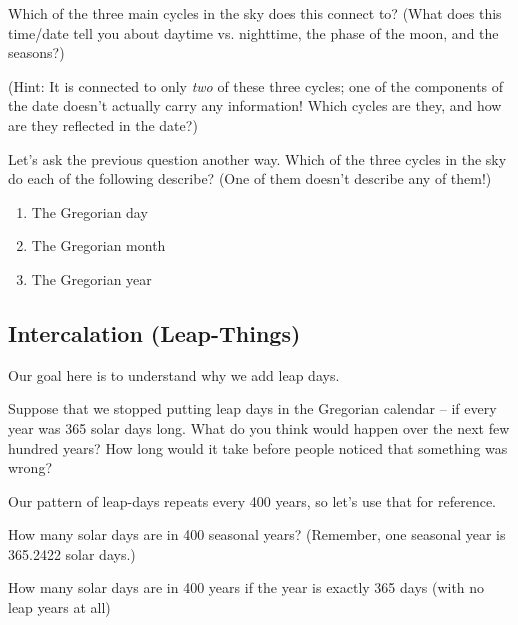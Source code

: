 \documentclass[11pt]{article}
\begin{document}
Which of the three main cycles in the sky does this connect to? (What does this time/date tell you about daytime vs. nighttime, the phase of the moon, and the seasons?) 

(Hint: It is connected to only {\it two} of these three cycles; one of the components of the date doesn't actually carry any information! Which cycles are they, and how are they reflected in the date?)

\vspace{2in} \underline{\hspace{6in}}

Let's ask the previous question another way. Which of the three cycles in the sky do each of the following describe? (One of them doesn't describe any of them!)

\begin{enumerate}
	\item The Gregorian day
	\vspace{0.5in}
	\item The Gregorian month
		\vspace{0.5in}
	\item The Gregorian year
\end{enumerate}

\newpage

\subsection{Intercalation (Leap-Things)}

Our goal here is to understand why we add leap days. 

Suppose that we stopped putting leap days in the Gregorian calendar -- if every year was 365 solar days long. What do you think would happen over the next few hundred years? How long would it take before people noticed that something was wrong?

\vspace{1.5in}

Our pattern of leap-days repeats every 400 years, so let's use that for reference. 
\vspace{1em}

\begin{minipage}{0.45\textwidth}
How many solar days are in 400 seasonal years? (Remember, one seasonal year is 365.2422 solar days.)

\vspace{1in}

\underline{\hspace{3in}}
\end{minipage}
\hspace{0.1\textwidth}
\begin{minipage}{0.45\textwidth}
	How many solar days are in 400 years if the year is exactly 365 days (with no leap years at all)
	
	\vspace{1in}
	
	\underline{\hspace{3in}}
\end{minipage}
\end{document}
